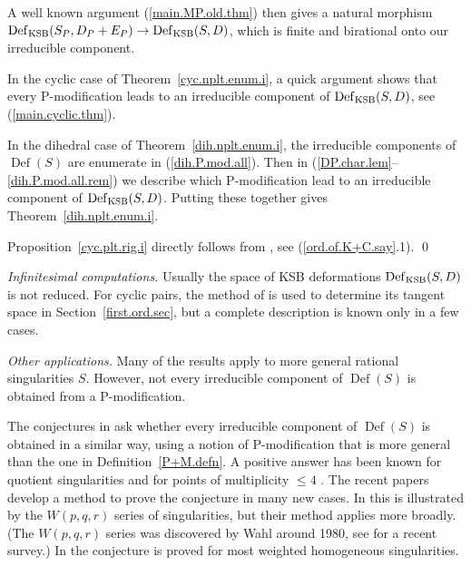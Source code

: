 \documentclass{amsart}
\theoremstyle{definition}
\theoremstyle{remark}
\newcommand{\defsp}[0]{\operatorname{Def}}
\begin{document}
 A well known argument (\ref{main.MP.old.thm}) then  gives  a natural morphism
$\defsp_{\rm KSB}(S_P, D_P+E_P) \to \defsp_{\rm KSB}(S,D)$, which is 
      finite and  birational  onto our irreducible component.
   
In the cyclic case of Theorem~\ref{cyc.nplt.enum.i}, a quick argument shows that every P-modification leads to an  irreducible component of 
$\defsp_{\rm KSB}(S,D)$, see (\ref{main.cyclic.thm}).

In the dihedral  case of Theorem~\ref{dih.nplt.enum.i},  the irreducible components of $\defsp(S)$ are enumerate in (\ref{dih.P.mod.all}).
Then in (\ref{DP.char.lem}--\ref{dih.P.mod.all.rem})  we describe which P-modification lead to an  irreducible component of 
$\defsp_{\rm KSB}(S,D)$.    Putting these together gives 
Theorem~\ref{dih.nplt.enum.i}.

Proposition~\ref{cyc.plt.rig.i}  directly follows from \cite[2.23]{k-modbook}, see (\ref{ord.of.K+C.say}.1). \qed

 


\medskip

{\it Infinitesimal computations.}  Usually the space of KSB deformations $\defsp_{\rm KSB}(S, D)$ is not reduced. For cyclic pairs, the method of  \cite{k-alt} is used to  determine its tangent space in Section~\ref{first.ord.sec}, but  a complete description is known only in a  few cases. 



  \medskip

{\it Other applications.}
Many of the results  apply to more general rational singularities  $S$.  However,  not   every irreducible component of $\defsp(S)$
 is obtained from a P-modification.


The conjectures in \cite[Sec.6]{k-etc} ask whether every irreducible component of $\defsp(S)$ is obtained in a similar way, using a  notion of P-modification that is more general than the one in Definition~\ref{P+M.defn}.  A positive answer  has been known for quotient singularities  \cite[3.9]{ksb} and  for  points of multiplicity $\leq 4$ \cite{MR1135880, MR1094706}.  The recent papers \cite{park2022deformations, jeon2023deformations} develop a method to prove the conjecture in many new cases. In \cite{park2022deformations} this is illustrated by the
$W(p,q,r)$ series of singularities, but their method  applies more broadly.  (The $W(p,q,r)$ series was  discovered by Wahl around 1980,  see \cite{MR4270358} for a recent survey.)  In \cite{jeon2023deformations} the conjecture is proved for most weighted homogeneous singularities.
\end{document}
